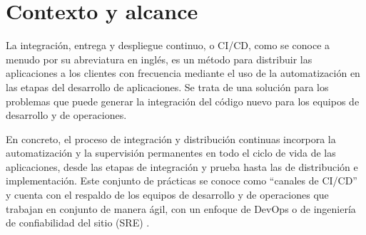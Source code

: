 \section{Contexto y alcance}




La integración, entrega y despliegue continuo, o CI/CD, como se conoce a menudo por su abreviatura en inglés, es un método para distribuir las aplicaciones a los clientes con frecuencia mediante el uso de la automatización en las etapas del desarrollo de aplicaciones. Se trata de una solución para los problemas que puede generar la integración del código nuevo para los equipos de desarrollo y de operaciones.

En concreto, el proceso de integración y distribución continuas incorpora la automatización y la supervisión permanentes en todo el ciclo de vida de las aplicaciones, desde las etapas de integración y prueba hasta las de distribución e implementación. Este conjunto de prácticas se conoce como ``canales de CI/CD'' y cuenta con el respaldo de los equipos de desarrollo y de operaciones que trabajan en conjunto de manera ágil, con un enfoque de DevOps o de ingeniería de confiabilidad del sitio (SRE) \cite{redHatCICD}.


